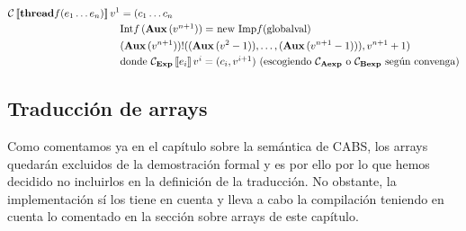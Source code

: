 \begin{align*}
\mathcal{C}\left\llbracket \textbf{thread} f(e_1 \dots e_n) \right\rrbracket v^{1} &= (c_1 \dots c_n\\
  &\mbox{Int$f\,(\textbf{Aux}\, (v^{n+1})) =$ new Imp$f($globalval$)$} \\
  &(\textbf{Aux}\, (v^{n+1}))!((\textbf{Aux}\, (v^{2} - 1)), \dots, (\textbf{Aux}\, (v^{n+1} - 1))), v^{n+1} + 1) \\
  &\mbox{donde $\mathcal{C}_{\textbf{Exp}}\left\llbracket e_i \right\rrbracket v^{i} = (c_i, v^{i+1})$ (escogiendo $\mathcal{C}_{\textbf{Aexp}}$ o $\mathcal{C}_{\textbf{Bexp}}$ según convenga)} \\
\end{align*}

\subsection{Traducción de arrays}

Como comentamos ya en el capítulo sobre la semántica de CABS, los arrays quedarán excluidos de la demostración formal y es por ello por lo que hemos decidido no incluirlos en la definición de la traducción. No obstante, la implementación sí los tiene en cuenta y lleva a cabo la compilación teniendo en cuenta lo comentado en la sección sobre arrays de este capítulo.
